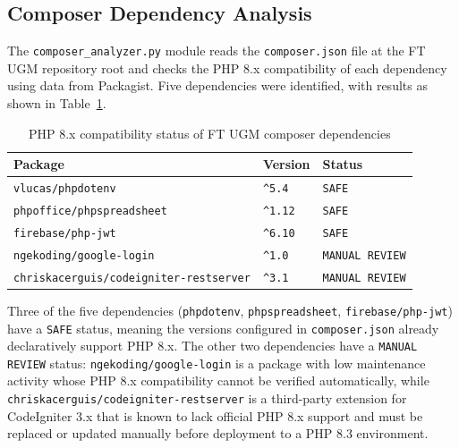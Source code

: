 \subsection{Composer Dependency Analysis}

The \texttt{composer\_analyzer.py} module reads the \texttt{composer.json} file at the FT UGM repository root and checks the PHP 8.x compatibility of each dependency using data from Packagist. Five dependencies were identified, with results as shown in Table~\ref{tab:composer-ft}.

\begin{table}[h]
\caption{PHP 8.x compatibility status of FT UGM composer dependencies}
\vspace{0.5em}
\centering
\label{tab:composer-ft}
\begin{tabularx}{\textwidth}{|l|l|X|}
\hline
\textbf{Package} & \textbf{Version} & \textbf{Status} \\
\hline \hline
\texttt{vlucas/phpdotenv} & \texttt{\^{}5.4} & \texttt{SAFE} \\
\hline
\texttt{phpoffice/phpspreadsheet} & \texttt{\^{}1.12} & \texttt{SAFE} \\
\hline
\texttt{firebase/php-jwt} & \texttt{\^{}6.10} & \texttt{SAFE} \\
\hline
\texttt{ngekoding/google-login} & \texttt{\^{}1.0} & \texttt{MANUAL REVIEW} \\
\hline
\texttt{chriskacerguis/codeigniter-restserver} & \texttt{\^{}3.1} & \texttt{MANUAL REVIEW} \\
\hline
\end{tabularx}
\end{table}

Three of the five dependencies (\texttt{phpdotenv}, \texttt{phpspreadsheet}, \texttt{firebase/\allowbreak php-jwt}) have a \texttt{SAFE} status, meaning the versions configured in \texttt{composer.json} already declaratively support PHP 8.x. The other two dependencies have a \texttt{MANUAL REVIEW} status: \texttt{ngekoding/\allowbreak google-login} is a package with low maintenance activity whose PHP 8.x compatibility cannot be verified automatically, while \texttt{chriskacerguis/\allowbreak codeigniter-restserver} is a third-party extension for CodeIgniter 3.x that is known to lack official PHP 8.x support and must be replaced or updated manually before deployment to a PHP 8.3 environment.

